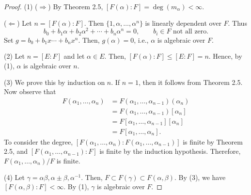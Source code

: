 \documentclass[twoside]{article}
\theoremstyle{remark}
\begin{document}
\begin{proof}
  (1) (\(\Rightarrow\)) By Theorem 2.5, \([F(\alpha):F] = \deg(m_\alpha) < \infty\). \par
  (\(\Leftarrow\)) Let \(n = [F(\alpha):F]\). Then \(\{1, \alpha, \dots, \alpha^n\}\) is linearly dependent over \(F\). Thus
  \[ b_0 + b_1\alpha + b_2\alpha^2 + \cdots + b_n\alpha^n = 0, \qquad \text{\(b_i \in F\) not all zero.} \]
  Set \(g = b_0 + b_1x \cdots + b_nx^n\). Then, \(g(\alpha) = 0\), i.e., \(\alpha\) is algebraic over \(F\).
  
  \smallskip
  
  (2) Let \(n = [E:F]\) and let \(\alpha \in E\). Then, \([F(\alpha) : F] \leq [E:F] = n\). Hence, by (1), \(\alpha\) is algebraic over \(n\).
  
  \smallskip
  
  (3) We prove this by induction on \(n\). If \(n=1\), then it follows from Theorem 2.5. Now observe that
  \begin{align*}
    F(\alpha_1, \dots, \alpha_n) & = F(\alpha_1, \dots, \alpha_{n-1}) (\alpha_n) \\
    & = F(\alpha_1, \dots, \alpha_{n-1}) [\alpha_n] \tag{by Theorem 2.5} \\
    & = F[\alpha_1, \dots, \alpha_{n-1}] [\alpha_n] \tag{by induction hypothesis} \\
    & = F[\alpha_1, \dots, \alpha_n].
  \end{align*}
  To consider the degree, \([F(\alpha_1, \dots, \alpha_n) : F(\alpha_1, \dots, \alpha_{n-1})]\) is finite by Theorem 2.5, and \([F(\alpha_1, \dots, \alpha_{n-1}):F]\) is finite by the induction hypothesis. Therefore, \(F(\alpha_1, \dots, \alpha_n) / F\) is finite.
  
  \smallskip
  
  (4) Let \(\gamma = \alpha\beta, \alpha \pm \beta, \alpha^{-1}\). Then, \(F \subset F(\gamma) \subset F(\alpha,\beta)\). By (3), we have \([F(\alpha,\beta):F] < \infty\). By (1), \(\gamma\) is algebraic over \(F\).
\end{proof}
\end{document}
